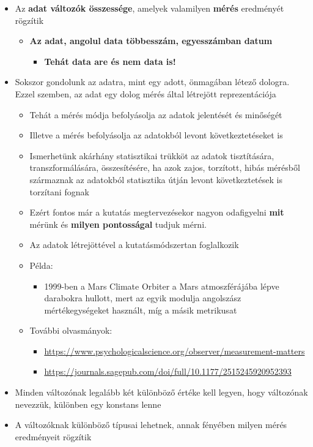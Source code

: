 \documentclass[
  letterpaper,
  DIV=11,
  numbers=noendperiod]{scrreprt}
\providecommand{\tightlist}{%
  \setlength{\itemsep}{0pt}\setlength{\parskip}{0pt}}\usepackage{longtable,booktabs,array}
\begin{document}
\begin{itemize}
\item
  Az \textbf{adat változók összessége}, amelyek valamilyen
  \textbf{mérés} eredményét rögzítik

  \begin{itemize}
  \item
    \textbf{Az adat, angolul data többesszám, egyesszámban datum}

    \begin{itemize}
    \tightlist
    \item
      \textbf{Tehát data are és nem data is!}
    \end{itemize}
  \end{itemize}
\item
  Sokszor gondolunk az adatra, mint egy adott, önmagában létező dologra.
  Ezzel szemben, az adat egy dolog mérés által létrejött reprezentációja

  \begin{itemize}
  \item
    Tehát a mérés módja befolyásolja az adatok jelentését és minőségét
  \item
    Illetve a mérés befolyásolja az adatokból levont következtetéseket
    is
  \item
    Ismerhetünk akárhány statisztikai trükköt az adatok tisztítására,
    transzformálására, összesítésére, ha azok zajos, torzított, hibás
    mérésből származnak az adatokból statisztika útján levont
    következtetések is torzítani fognak
  \item
    Ezért fontos már a kutatás megtervezésekor nagyon odafigyelni
    \textbf{mit} mérünk és \textbf{milyen pontosságal} tudjuk mérni.
  \item
    Az adatok létrejöttével a kutatásmódszertan foglalkozik
  \item
    Példa:

    \begin{itemize}
    \tightlist
    \item
      1999-ben a Mars Climate Orbiter a Mars atmoszférájába lépve
      darabokra hullott, mert az egyik modulja angolszász
      mértékegységeket használt, míg a másik metrikusat
    \end{itemize}
  \item
    További olvasmányok:

    \begin{itemize}
    \item
      \url{https://www.psychologicalscience.org/observer/measurement-matters}
    \item
      \url{https://journals.sagepub.com/doi/full/10.1177/2515245920952393}
    \end{itemize}
  \end{itemize}
\item
  Minden változónak legalább két különböző értéke kell legyen, hogy
  változónak nevezzük, különben egy konstans lenne
\item
  A változóknak különböző típusai lehetnek, annak fényében milyen mérés
  eredményeit rögzítik
\end{itemize}
\end{document}
